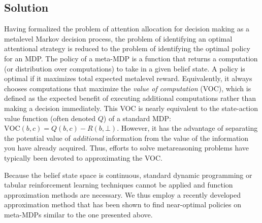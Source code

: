 \documentclass[12pt,a4paperpaper,]{article}
\begin{document}
\subsection{Solution}
Having formalized the problem of attention allocation for decision making as a metalevel Markov decision process, the problem of identifying an optimal attentional strategy is reduced to the problem of identifying the optimal policy for an MDP. The policy of a meta-MDP is a function that returns a computation (or distribution over computations) to take in a given belief state. A policy is optimal if it maximizes total expected metalevel reward. Equivalently, it always chooses computations that maximize the \emph{value of computation} (VOC), which is defined as the expected benefit of executing additional computations rather than making a decision immediately.
This VOC is nearly equivalent to the state-action value function (often denoted $Q$) of a standard MDP: $\text{VOC}(b, c) = Q(b, c) - R(b, \bot)$. However, it has the advantage of separating the potential value of \textit{additional} information from the value of the information you have already acquired. Thus, efforts to solve metareasoning problems have typically been devoted to approximating the VOC.

Because the belief state space is continuous, standard dynamic programming or tabular reinforcement learning techniques cannot be applied and function approximation methods are necessary. We thus employ a recently developed approximation method \citep{callaway2018learning} that has been shown to find near-optimal policies on meta-MDPs similar to the one presented above.



\end{document}
